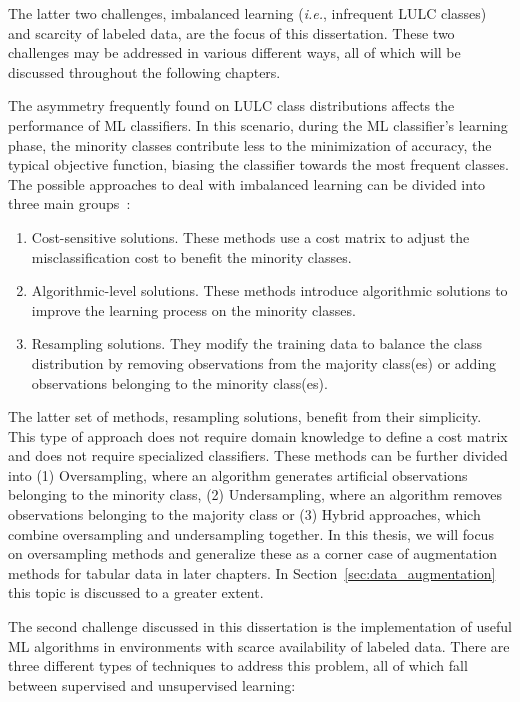 The latter two challenges, imbalanced learning (\textit{i.e.}, infrequent LULC
classes) and scarcity of labeled data, are the focus of this dissertation.
These two challenges may be addressed in various different ways, all of which
will be discussed throughout the following chapters.

The asymmetry frequently found on LULC class distributions affects the
performance of ML classifiers. In this scenario, during the ML classifier's
learning phase, the minority classes contribute less to the minimization of
accuracy, the typical objective function, biasing the classifier towards the
most frequent classes. The possible approaches to deal with imbalanced
learning can be divided into three main groups~\cite{Fernandez2013}: 

\begin{enumerate}
    \item Cost-sensitive solutions. These methods use a cost matrix to adjust
        the misclassification cost to benefit the minority classes.
    \item Algorithmic-level solutions. These methods introduce algorithmic
        solutions to improve the learning process on the minority classes. 
    \item Resampling solutions. They modify the training data to balance the
        class distribution by removing observations from the majority
        class(es) or adding observations belonging to the minority class(es).
\end{enumerate}

The latter set of methods, resampling solutions, benefit from their
simplicity. This type of approach does not require domain knowledge to define
a cost matrix and does not require specialized classifiers. These methods
can be further divided into (1) Oversampling, where an algorithm generates
artificial observations belonging to the minority class, (2) Undersampling,
where an algorithm removes observations belonging to the majority class or (3)
Hybrid approaches, which combine oversampling and undersampling together. In
this thesis, we will focus on oversampling methods and generalize these as a
corner case of augmentation methods for tabular data in later chapters. In
Section~\ref{sec:data_augmentation} this topic is discussed to a greater
extent.

The second challenge discussed in this dissertation is the implementation of
useful ML algorithms in environments with scarce availability of labeled data.
There are three different types of techniques to address this problem, all of
which fall between supervised and unsupervised learning:


